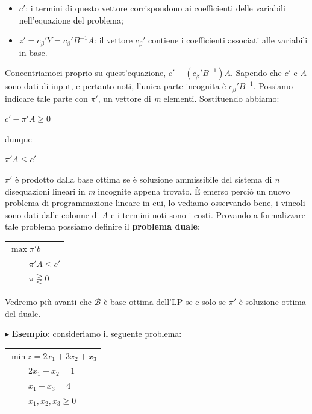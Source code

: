 \documentclass[11pt]{book}
\begin{document}
\begin{itemize}
\item $c'$: i termini di questo vettore corrispondono ai coefficienti
  delle variabili nell'equazione del problema;

\item $z' = c_\beta' Y = c_\beta' B^{-1}A$: il vettore $c_\beta'$
  contiene i coefficienti associati alle variabili in base.
\end{itemize}

Concentriamoci proprio su quest'equazione,
$c'-(c_\beta'B^{-1})A$. Sapendo che $c'$ e $A$ sono dati di input,
e pertanto noti, l'unica parte incognita \`e
$c_\beta'B^{-1}$. Possiamo indicare tale parte con $\pi'$, un vettore
di {\em m} elementi. Sostituendo abbiamo:

\begin{center}
$c'-\pi'A \geq 0$
\end{center}

dunque

\begin{center}
$\pi'A \leq c'$
\end{center}

$\pi'$ \`e prodotto dalla base ottima se \`e soluzione ammissibile del
sistema di {\em n} disequazioni lineari in {\em m} incognite appena
trovato. \`E emerso perci\`o un nuovo problema di programmazione
lineare in cui, lo vediamo osservando bene, i vincoli sono dati dalle
colonne di {\em A} e i termini noti sono i costi. Provando a
formalizzare tale problema possiamo definire il {\bf problema duale}:

\vspace{11pt}
\begin{center}
\begin{tabular}{l}
$\max \pi'b$ \\
$\phantom{mina}\pi'A \leq c'$ \\
$\phantom{mina}\pi \gtreqless 0$ \\
\end{tabular}
\end{center}
\vspace{11pt}

Vedremo pi\`u avanti che $\mathcal{B}$ \`e base ottima dell'LP se e
solo se $\pi'$ \`e soluzione ottima del duale.

\vspace{11pt}
$\blacktriangleright$ {\bf Esempio}: consideriamo il seguente
problema:

\vspace{11pt}
\begin{center}
\begin{tabular}{l}
$\min z = 2x_1 + 3x_2 + x_3$\\
$\phantom{min z}2x_1 + x_2 = 1$\\
$\phantom{min z}x_1 + x_3 = 4$\\
$\phantom{min z}x_1,x_2,x_3 \geq 0$\\
\end{tabular}
\end{center}
\vspace{11pt}
\end{document}
